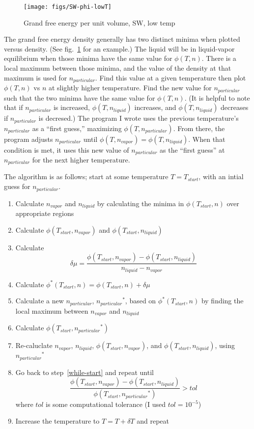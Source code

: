 \documentclass[letterpaper,twocolumn,amsmath,amssymb,prb]{revtex4-1}
\newcommand{\npart}{\ensuremath{n_{particular}}}
\newcommand{\nliq}{\ensuremath{n_{liquid}}}
\newcommand{\nvap}{\ensuremath{n_{vapor}}}
\newcommand{\1}{\ensuremath{\textbf{r}_1}}
\newcommand{\2}{\ensuremath{\textbf{r}_2}}
\newcommand{\3}{\ensuremath{\textbf{r}_3}}
\newcommand{\4}{\ensuremath{\textbf{r}_4}}
\begin{document}
\begin{figure}
  \centering
  \texttt{[image: figs/SW-phi-lowT]}
  \caption{Grand free energy per unit volume, SW, low temp}
  \label{fig:SW-phi-lowT}
\end{figure}

The grand free energy density generally has two distinct minima when
plotted versus density. (See fig.~\ref{fig:SW-phi-lowT} for an
example.) The liquid will be in liquid-vapor equilibrium when those
minima have the same value for $\phi(T,n)$. There is a local maximum
between those minima, and the value of the density at that maximum is
used for $\npart$. Find this value at a given temperature then plot
$\phi(T,n)$ vs $n$ at slightly higher temperature. Find the new value
for $\npart$ such that the two minima have the same value for
$\phi(T,n)$. (It is helpful to note that if $\npart$ is increased,
$\phi(T,\nliq)$ increases, and $\phi(T,\nliq)$ decreases if $\npart$
is decresed.) The program I wrote uses the previous temperature's
$\npart$ as a ``first guess,'' maximizing $\phi(T,\npart)$. From
there, the program adjusts $\npart$ until $\phi(T,\nvap) =
\phi(T,\nliq)$. When that condition is met, it uses this new value of
$\npart$ as the ``first guess'' at $\npart$ for the next higher
temperature.

The algorithm is as follows; start at some temperature $T=T_{start}$,
with an intial guess for $\npart$.
\begin{enumerate}
  \item Calculate $\nvap$ and $\nliq$ by calculating the minima in $\phi(T_{start},n)$ over appropriate regions
  \item Calculate $\phi(T_{start},\nvap)$ and $\phi(T_{start},\nliq)$ \label{while-start}
  \item Calculate \[\delta\mu = \frac{\phi(T_{start},\nvap) - \phi(T_{start},\nliq)}{\nliq - \nvap}\]
  \item Calculate $\phi^*(T_{start},n) = \phi(T_{start},n) + \delta\mu$
  \item Calculate a new $\npart$, $\npart^*$, based on $\phi^*(T_{start},n)$ by finding the local maximum between $\nvap$ and $\nliq$
  \item Calculate $\phi(T_{start},\npart^*)$
  \item Re-caluclate $\nvap$, $\nliq$, $\phi(T_{start},\nvap)$, and $\phi(T_{start},\nliq)$, using $\npart^*$
  \item Go back to step~\ref{while-start} and repeat until \[ \frac{\phi(T_{start},\nvap) - \phi(T_{start},\nliq)}{\phi(T_{start},\npart^*)} > tol  \] where $tol$ is some computational tolerance (I used $tol=10^{-5}$)
  \item Increase the temperature to $T = T + \delta T$ and repeat
\end{enumerate}
\end{document}
